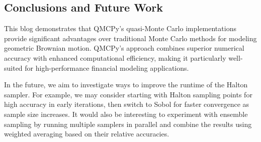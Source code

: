\bigskip
\subsection{Conclusions and Future Work}

This blog demonstrates that QMCPy's quasi-Monte Carlo implementations provide
significant advantages over traditional Monte Carlo methods for modeling
geometric Brownian motion. QMCPy's approach combines superior numerical accuracy
with enhanced computational efficiency, making it particularly well-suited for
high-performance financial modeling applications. 

In the future, we aim to investigate ways to improve the runtime of the Halton
sampler. For example, we may consider starting with Halton sampling points for
high accuracy in early iterations, then switch to Sobol for faster convergence
as sample size increases. It would also be interesting to experiment with
ensemble sampling by running multiple samplers in parallel and combine the
results using weighted averaging based on their relative accuracies.

